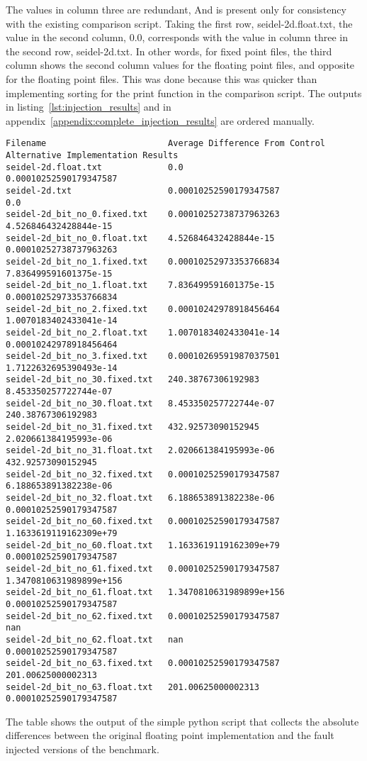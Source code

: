 The values in column three are redundant, And is present only for consistency with the existing comparison script. Taking the first row, seidel-2d.float.txt, the value in the second column, 0.0, corresponds with the value in column three in the second row, seidel-2d.txt. In other words, for fixed point files, the third column shows the second column values for the floating point files, and opposite for the floating point files. This was done because this was quicker than implementing sorting for the print function in the comparison script. The outputs in listing~\ref{lst:injection_results} and in appendix~\ref{appendix:complete_injection_results} are ordered manually.

\begin{verbatim}
Filename                        Average Difference From Control         Alternative Implementation Results
seidel-2d.float.txt             0.0                                     0.00010252590179347587
seidel-2d.txt                   0.00010252590179347587                  0.0
seidel-2d_bit_no_0.fixed.txt    0.00010252738737963263                  4.526846432428844e-15 
seidel-2d_bit_no_0.float.txt    4.526846432428844e-15                   0.00010252738737963263 
seidel-2d_bit_no_1.fixed.txt    0.00010252973353766834                  7.836499591601375e-15
seidel-2d_bit_no_1.float.txt    7.836499591601375e-15                   0.00010252973353766834
seidel-2d_bit_no_2.fixed.txt    0.00010242978918456464                  1.0070183402433041e-14
seidel-2d_bit_no_2.float.txt    1.0070183402433041e-14                  0.00010242978918456464
seidel-2d_bit_no_3.fixed.txt    0.00010269591987037501                  1.7122632695390493e-14
seidel-2d_bit_no_30.fixed.txt   240.38767306192983                      8.453350257722744e-07
seidel-2d_bit_no_30.float.txt   8.453350257722744e-07                   240.38767306192983
seidel-2d_bit_no_31.fixed.txt   432.92573090152945                      2.020661384195993e-06
seidel-2d_bit_no_31.float.txt   2.020661384195993e-06                   432.92573090152945
seidel-2d_bit_no_32.fixed.txt   0.00010252590179347587                  6.188653891382238e-06
seidel-2d_bit_no_32.float.txt   6.188653891382238e-06                   0.00010252590179347587
seidel-2d_bit_no_60.fixed.txt   0.00010252590179347587                  1.1633619119162309e+79
seidel-2d_bit_no_60.float.txt   1.1633619119162309e+79                  0.00010252590179347587
seidel-2d_bit_no_61.fixed.txt   0.00010252590179347587                  1.3470810631989899e+156
seidel-2d_bit_no_61.float.txt   1.3470810631989899e+156                 0.00010252590179347587
seidel-2d_bit_no_62.fixed.txt   0.00010252590179347587                  nan
seidel-2d_bit_no_62.float.txt   nan                                     0.00010252590179347587
seidel-2d_bit_no_63.fixed.txt   0.00010252590179347587                  201.00625000002313
seidel-2d_bit_no_63.float.txt   201.00625000002313                      0.00010252590179347587
\end{verbatim}
\label{lst:injection_results}
\caption{The table shows the output of the simple python script that collects the absolute differences between the original floating point implementation and the fault injected versions of the benchmark.}

